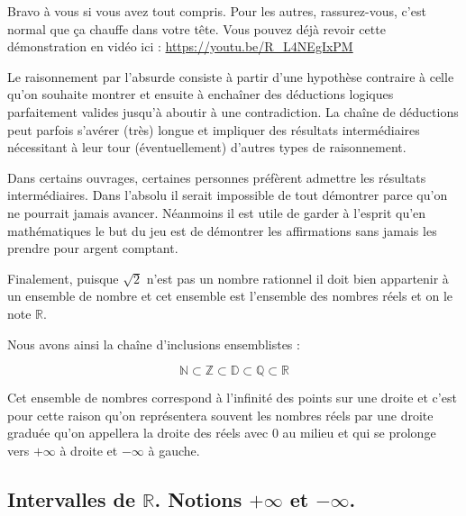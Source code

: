 \documentclass[11pt]{article}
\begin{document}
Bravo à vous si vous avez tout compris. Pour les autres,
rassurez-vous, c'est normal que ça chauffe dans votre tête. Vous
pouvez déjà revoir cette démonstration en vidéo ici :
\url{https://youtu.be/R\_L4NEgIxPM}

Le raisonnement par l'absurde consiste à partir d'une hypothèse
contraire à celle qu'on souhaite montrer et ensuite à enchaîner des
déductions logiques parfaitement valides jusqu'à aboutir à une
contradiction. La chaîne de déductions peut parfois s'avérer (très)
longue et impliquer des résultats intermédiaires nécessitant à leur
tour (éventuellement) d'autres types de raisonnement.

Dans certains ouvrages, certaines personnes préfèrent admettre les
résultats intermédiaires. Dans l'absolu il serait impossible de
tout démontrer parce qu'on ne pourrait jamais avancer. Néanmoins il
est utile de garder à l'esprit qu'en mathématiques le but du jeu
est de démontrer les affirmations sans jamais les prendre pour
argent comptant.

Finalement, puisque \(\sqrt{2}\) n'est pas un nombre rationnel il
doit bien appartenir à un ensemble de nombre et cet ensemble est
l'ensemble des nombres réels et on le note \(\mathbb{R}\).

Nous avons ainsi la chaîne d'inclusions ensemblistes :

\[\mathbb{N}\subset\mathbb{Z}\subset\mathbb{D}\subset\mathbb{Q}\subset\mathbb{R}\]

Cet ensemble de nombres correspond à l'infinité des points sur une
droite et c'est pour cette raison qu'on représentera souvent les
nombres réels par une droite graduée qu'on appellera la droite des
réels avec 0 au milieu et qui se prolonge vers \(+\infty\) à droite
et \(-\infty\) à gauche.



\subsection{Intervalles de \(\mathbb{R}\). Notions \(+\infty\) et \(-\infty\).}
\label{sec:org108e677}
\end{document}
